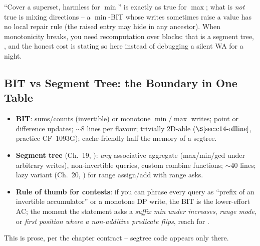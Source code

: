 \begin{warningbox}
``Cover a superset, harmless for \(\min\)'' is exactly as true for \(\max\);
what is \emph{not} true is mixing directions -- a \(\min\)-BIT whose writes
sometimes raise a value has no local repair rule (the raised entry may hide
in any ancestor).  When monotonicity breaks, you need recomputation over
blocks: that is a segment tree, , and the honest cost is stating
so here instead of debugging a silent WA for a night.
\end{warningbox}

\subsection{BIT vs Segment Tree: the Boundary in One Table}

\begin{comparisonbox}
\begin{itemize}[nosep,leftmargin=1.4em]
  \item \textbf{BIT}: sums/counts (invertible) or monotone \(\min/\max\)
        writes; point or difference updates; \(\sim\)8 lines per flavour;
        trivially 2D-able (\(\secref{c14-offline}\), practice CF~1093G);
        cache-friendly half the memory of a segtree.
  \item \textbf{Segment tree} (Ch.~19, ): \emph{any} associative
        aggregate (max/min/gcd under arbitrary writes), non-invertible
        queries, custom combine functions; \(\sim\)40 lines; lazy variant
        (Ch.~20, ) for range assign/add with range asks.
  \item \textbf{Rule of thumb for contests}: if you can phrase every query
        as ``prefix of an invertible accumulator'' or a monotone DP write,
        the BIT is the lower-effort AC; the moment the statement asks a
        \emph{suffix min under increases}, \emph{range mode}, or
        \emph{first position where a non-additive predicate flips}, reach
        for .
\end{itemize}
This is prose, per the chapter contract -- segtree code appears only there.
\end{comparisonbox}

